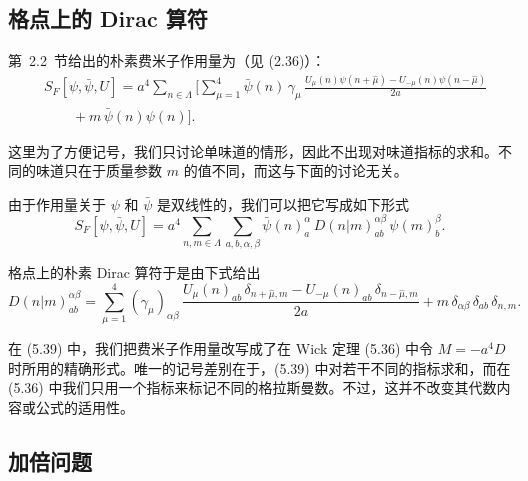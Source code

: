 \subsection{格点上的 Dirac 算符}

第~2.2~节给出的朴素费米子作用量为（见 (2.36)）：
\begin{equation}
  \begin{aligned}
    &S_F[\psi,\bar{\psi},U] = a^4\sum_{n\in\Lambda}\Big[
      \sum_{\mu=1}^{4}\bar{\psi}(n)\,\gamma_\mu\,
      \frac{U_\mu(n)\psi(n+\hat{\mu}) - U_{-\mu}(n)\psi(n-\hat{\mu})}{2a}\\
    &\qquad + m\,\bar{\psi}(n)\psi(n)\Big] .
  \end{aligned}
\end{equation}

这里为了方便记号，我们只讨论单味道的情形，因此不出现对味道指标的求和。不同的味道只在于质量参数 $m$ 的值不同，而这与下面的讨论无关。

由于作用量关于 $\psi$ 和 $\bar{\psi}$ 是双线性的，我们可以把它写成如下形式
\begin{equation}
  S_F[\psi,\bar{\psi},U] = a^4\sum_{n,m\in\Lambda}\sum_{a,b,\alpha,\beta}
    \bar{\psi}(n)^{\alpha}_a\,D(n|m)^{\alpha\beta}_{ab}\,\psi(m)^{\beta}_b .
\end{equation}

格点上的朴素 Dirac 算符于是由下式给出
\begin{equation}
  D(n|m)^{\alpha\beta}_{ab} = \sum_{\mu=1}^{4}(\gamma_\mu)_{\alpha\beta}\,
    \frac{U_\mu(n)_{ab}\,\delta_{n+\hat{\mu},m} - U_{-\mu}(n)_{ab}\,\delta_{n-\hat{\mu},m}}{2a}
    + m\,\delta_{\alpha\beta}\,\delta_{ab}\,\delta_{n,m} .
\end{equation}

在 (5.39) 中，我们把费米子作用量改写成了在 Wick 定理 (5.36) 中令 $M = -a^4 D$ 时所用的精确形式。唯一的记号差别在于，(5.39) 中对若干不同的指标求和，而在 (5.36) 中我们只用一个指标来标记不同的格拉斯曼数。不过，这并不改变其代数内容或公式的适用性。

\subsection{加倍问题}

